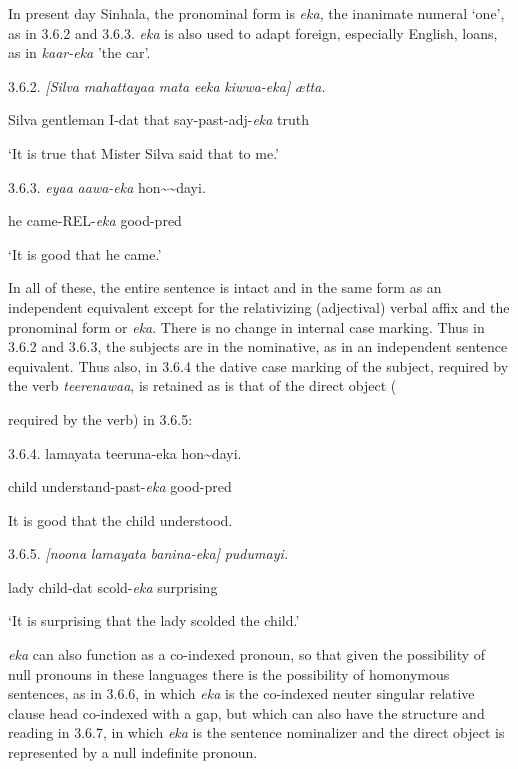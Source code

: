 \documentclass[letterpaper]{article}
\begin{document}
 In present day Sinhala, the pronominal form is \textit{eka}, the inanimate numeral `one', as in 3.6.2 and 3.6.3. \textit{eka} is also used to adapt foreign, especially English, loans, as in \textit{kaar-eka} 'the car'.

 3.6.2. \textit{[Silva} \textit{mahattayaa} \textit{mat}\textit{{\dag}}\textit{a} \textit{eeka} \textit{kiwwa-eka]} \textit{{\ae}tta.}

    
\ea
\gll Silva  gentleman  I-dat that  say-past-adj-\textit{eka} truth

    `It is true that Mister Silva said that to me.'

 3.6.3. 
\ea
\gll \textit{eyaa} \textit{aawa-eka}  hon{\~{}}{\~{}}dayi.

  he  came-REL-\textit{eka}  good-pred

  `It is good that he came.'

 In all of these, the entire sentence is intact and in the same form as an independent equivalent except for the relativizing (adjectival) verbal affix and the pronominal form or \textit{eka}. There is no change in internal case marking. Thus in 3.6.2 and 3.6.3, the subjects are in the nominative, as in an independent sentence equivalent. Thus also, in 3.6.4 the dative case marking of the subject, required by the verb \textit{teerenawaa}, is retained as is that of the direct object  (

required by the verb) in 3.6.5:

  3.6.4.
\ea
\gll  lamayat{\dag}a teeruna-eka hon{\~{}}dayi.

  child understand-past-\textit{eka} good-pred

  It is good that the child understood.

 3.6.5.
\ea
\gll  \textit{[noona} \textit{lamayat}\textit{{\dag}}\textit{a} \textit{banina-eka]} \textit{pudumayi.}

  lady  child-dat scold-\textit{eka}  surprising

  `It is surprising that the lady scolded the child.'

\textit{eka} can also function as a co-indexed pronoun, so that given the possibility of null pronouns in these languages there is the possibility of homonymous sentences, as in 3.6.6, in which \textit{eka} is the co-indexed neuter singular relative clause head co-indexed with a gap, but which can also have the structure and reading in 3.6.7, in which \textit{eka} is  the sentence nominalizer  and the direct object is represented by a null indefinite pronoun.
\end{document}
